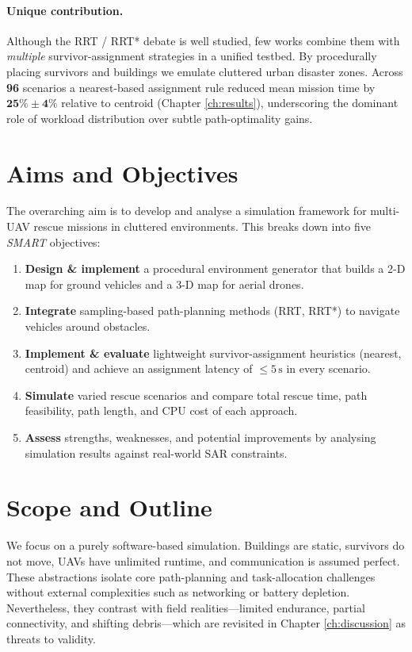 \documentclass[12pt,a4paper]{report}
\begin{document}
\paragraph{Unique contribution.}
Although the RRT / RRT* debate is well studied, few works combine them with
\emph{multiple} survivor-assignment strategies in a unified testbed.
By procedurally placing survivors and buildings we emulate cluttered urban
disaster zones.  
Across \textbf{96} scenarios a nearest-based assignment rule reduced mean
mission time by \(\mathbf{25\% \pm 4\%}\) relative to centroid
(Chapter \ref{ch:results}), underscoring the dominant role of workload
distribution over subtle path-optimality gains.

\section{Aims and Objectives}
\label{sec:aims}
The overarching aim is to develop and analyse a simulation framework for
multi-UAV rescue missions in cluttered environments.
This breaks down into five \emph{SMART} objectives:

\begin{enumerate}[label=\textbf{Obj\arabic*:},leftmargin=2.6em]
  \item \textbf{Design \& implement} a procedural environment generator that
        builds a 2-D map for ground vehicles and a 3-D map for aerial drones.
  \item \textbf{Integrate} sampling-based path-planning methods (RRT, RRT*) to
        navigate vehicles around obstacles.
  \item \textbf{Implement \& evaluate} lightweight survivor-assignment
        heuristics (nearest, centroid) and achieve an assignment latency
        of \(\le 5\,\text{s}\) in every scenario.
  \item \textbf{Simulate} varied rescue scenarios and compare total rescue
        time, path feasibility, path length, and CPU cost of each approach.
  \item \textbf{Assess} strengths, weaknesses, and potential improvements by
        analysing simulation results against real-world SAR constraints.
\end{enumerate}

\section{Scope and Outline}
\label{sec:scope}
We focus on a purely software-based simulation. Buildings are static, survivors
do not move, UAVs have unlimited runtime, and communication is assumed perfect.
These abstractions isolate core path-planning and task-allocation challenges
without external complexities such as networking or battery depletion.
Nevertheless, they contrast with field realities—limited endurance, partial
connectivity, and shifting debris—which are revisited in
Chapter \ref{ch:discussion} as threats to validity.
\end{document}
